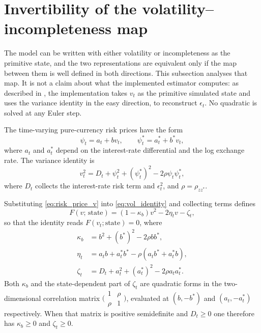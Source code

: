 \documentclass[11pt]{article}
\theoremstyle{definition}
\begin{document}
\FloatBarrier
\section{Invertibility of the volatility--incompleteness map}\label{app:invert}

The model can be written with either volatility or incompleteness as the primitive state, and the two representations are equivalent only if the map between them is well defined in both directions. This subsection analyses that map. It is not a claim about what the implemented estimator computes: as described in , the implementation takes $v_t$ as the primitive simulated state and uses the variance identity in the easy direction, to reconstruct $\epsilon_t$. No quadratic is solved at any Euler step.

The time-varying pure-currency risk prices have the form
\begin{equation}\label{eq:risk_price_v}
\psi_t=a_t+bv_t,
\qquad
\psi_t^*=a_t^*+b^*v_t,
\end{equation}
where $a_t$ and $a_t^*$ depend on the interest-rate differential and the log exchange rate. The variance identity is
\begin{equation}\label{eq:vol_identity}
v_t^2
=D_t+\psi_t^2+(\psi_t^*)^2-2\rho\psi_t\psi_t^*,
\end{equation}
where $D_t$ collects the interest-rate risk term and $\epsilon_t^2$, and $\rho=\rho_{zz^*}$.

Substituting \eqref{eq:risk_price_v} into \eqref{eq:vol_identity} and collecting terms defines
\begin{equation}\label{eq:F_definition}
F(v;\,\text{state})=(1-\kappa_b)v^2-2\eta_tv-\zeta_t,
\end{equation}
so that the identity reads $F(v_t;\text{state})=0$, where
\begin{align}
\kappa_b&=b^2+(b^*)^2-2\rho bb^*, \label{eq:kappa_b}\\
\eta_t&=a_tb+a_t^*b^*-\rho(a_tb^*+a_t^*b),\\
\zeta_t&=D_t+a_t^2+(a_t^*)^2-2\rho a_ta_t^*.
\end{align}
Both $\kappa_b$ and the state-dependent part of $\zeta_t$ are quadratic forms in the two-dimensional correlation matrix $\bigl(\begin{smallmatrix}1&\rho\\\rho&1\end{smallmatrix}\bigr)$, evaluated at $(b,-b^*)$ and $(a_t,-a_t^*)$ respectively. When that matrix is positive semidefinite and $D_t\ge0$ one therefore has $\kappa_b\ge0$ and $\zeta_t\ge0$.
\end{document}
